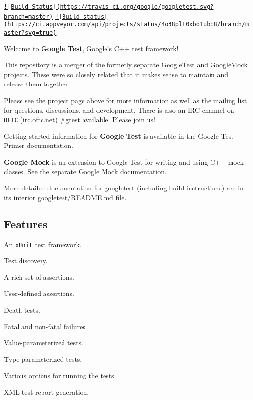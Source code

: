 \href{https://travis-ci.org/google/googletest}{\tt !\mbox{[}Build Status\mbox{]}(https\-://travis-\/ci.\-org/google/googletest.\-svg?branch=master)} \href{https://ci.appveyor.com/project/GoogleTestAppVeyor/googletest/branch/master}{\tt !\mbox{[}Build status\mbox{]}(https\-://ci.\-appveyor.\-com/api/projects/status/4o38plt0xbo1ubc8/branch/master?svg=true)}

Welcome to {\bfseries Google Test}, Google's C++ test framework!

This repository is a merger of the formerly separate Google\-Test and Google\-Mock projects. These were so closely related that it makes sense to maintain and release them together.

Please see the project page above for more information as well as the mailing list for questions, discussions, and development. There is also an I\-R\-C channel on \href{https://webchat.oftc.net/}{\tt O\-F\-T\-C} (irc.\-oftc.\-net) \#gtest available. Please join us!

Getting started information for {\bfseries Google Test} is available in the Google Test Primer documentation.

{\bfseries Google Mock} is an extension to Google Test for writing and using C++ mock classes. See the separate Google Mock documentation.

More detailed documentation for googletest (including build instructions) are in its interior googletest/\-R\-E\-A\-D\-M\-E.md file.

\subsection*{Features}


\begin{DoxyItemize}
\item An \href{https://en.wikipedia.org/wiki/XUnit}{\tt x\-Unit} test framework.
\item Test discovery.
\item A rich set of assertions.
\item User-\/defined assertions.
\item Death tests.
\item Fatal and non-\/fatal failures.
\item Value-\/parameterized tests.
\item Type-\/parameterized tests.
\item Various options for running the tests.
\item X\-M\-L test report generation.
\end{DoxyItemize}

